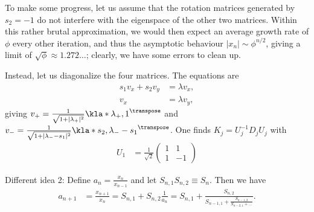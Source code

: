 \documentclass[english, parskip=full]{scrartcl}
\begin{document}

To make some progress, let us assume that the rotation matrices generated by $s_2=-1$ do not interfere with the eigenspace of the other two matrices.
Within this rather brutal approximation, we would then expect an average growth rate of $\phi$ every other iteration, and thus the asymptotic behaviour $|x_n| \sim \phi^{n/2}$, giving a limit of $\sqrt{\phi} \approx 1.272\dots$; clearly, we have some errors to clean up.

Instead, let us diagonalize the four matrices.
The equations are
\begin{align}
s_1v_x + s_2v_y &= \lambda v_x,\\
v_x &= \lambda v_y,
\end{align}
giving $v_+ = \frac{1}{\sqrt{1 + |\lambda_+|^2}} \kla*{\lambda_+, 1}^\transpose$ and $v_- = \frac{1}{\sqrt{1 + |\lambda_- - s_1|^2}} \kla*{s_2, \lambda_- - s_1}^\transpose$.
One finds $K_j = U_j^{-1} D_j U_j$ with
\begin{align}
U_1 &= \frac{1}{\sqrt{2}} \begin{pmatrix}
1 & 1 \\ 1 & -1
\end{pmatrix}
\end{align}

Different idea 2:
Define $a_n = \frac{x_n}{x_{n-1}}$ and let $S_{n,1} S_{n,2} \equiv S_n$.
Then we have
\begin{align}
a_{n+1} &= \frac{x_{n+1}}{x_n} = S_{n,1} + S_{n,2} \frac{1}{a_n} = S_{n,1} + \frac{S_{n,2}}{S_{n-1,1} + \frac{S_{n-1,2}}{S_{n-2,1} + \dots}}.
\end{align}
\end{document}
